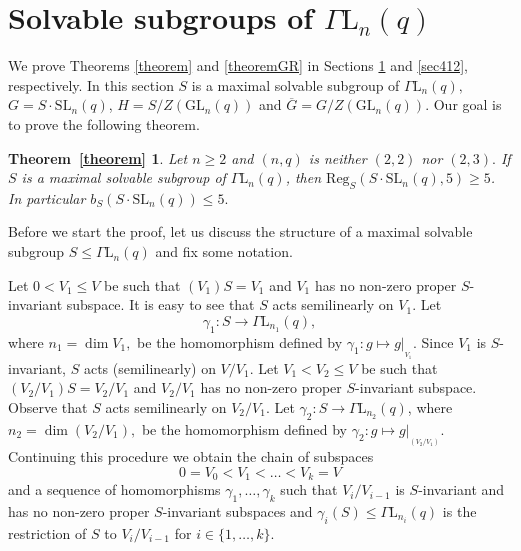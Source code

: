 \documentclass[a4paper,reqno,11pt]{amsart}
\newtheorem*{T1}{Theorem~\ref{theorem}}
\theoremstyle{definition}
\theoremstyle{remark}
\numberwithin{equation}{section}
\newcommand{\Reg}{\mathrm{Reg}}
\newcommand{\GaL}{{\Gamma \mathrm{L}}}
\newcommand{\SL}{{\mathrm{SL}}}
\newcommand{\GL}{{\mathrm{GL}}}
\begin{document}
\section{Solvable subgroups of $\GaL_n(q)$}
\label{sec411}

We prove Theorems \ref{theorem} and \ref{theoremGR} in Sections \ref{sec411} and \ref{sec412}, respectively.
In this section $S$ is a maximal solvable subgroup of $\GaL_n(q),$ $G=S \cdot \SL_n(q)$, $H=S/Z(\GL_n(q))$ and $\overline{G}=G/Z(\GL_n(q)).$ Our goal is to prove the following theorem.

\begin{T1}
Let  $n \ge 2$ and $(n,q)$ is neither $(2,2)$ nor $(2,3).$ If $S$ is a maximal solvable subgroup of $\GaL_n(q)$, 
 then $\Reg_S(S \cdot \SL_n(q),5)\ge 5$. In particular $b_S(S \cdot \SL_n(q)) \le 5.$
\end{T1}



Before we start the proof, let us discuss the structure of a maximal solvable subgroup $S \le \GaL_n(q)$ and fix some notation. 

Let $0< V_1 \le V$ be such that $(V_1)S=V_1$ and $V_1$ has no non-zero proper $S$-invariant subspace. It is easy to see that $S$ acts semilinearly on $V_1$. Let $$\gamma_1:S \to \GaL_{n_1}(q),$$ where $n_1=\dim V_1,$ be the homomorphism defined by $\gamma_1:g \mapsto g|_{_{V_1}}.$  Since $V_1$ is $S$-invariant, $S$ acts (semilinearly) on $V/V_1.$ Let $V_1 < V_2 \le V$ be such that $(V_2/V_1)S=V_2/V_1$ and $V_2/V_1$ has no non-zero proper $S$-invariant subspace.  Observe that $S$ acts semilinearly on $V_2/V_1$. Let $\gamma_2:S \to \GaL_{n_2}(q)$, where $n_2=\dim (V_2/V_1),$ be the homomorphism defined by $\gamma_2:g \mapsto g|_{_{(V_2/V_1)}}.$ 
Continuing this procedure we obtain the chain of subspaces 
\begin{equation}
\label{Gchain}
0=V_0<V_1< \ldots < V_k=V
\end{equation}
 and a sequence of homomorphisms $\gamma_1, \ldots, \gamma_k$ such that $V_{i}/V_{i-1}$ is $S$-invariant and has no  non-zero proper $S$-invariant  subspaces and $\gamma_i(S) \le \GaL_{n_i}(q)$ is the restriction of $S$ to $V_{i}/V_{i-1}$ for $i \in \{1, \ldots, k\}.$ 
 
\end{document}
